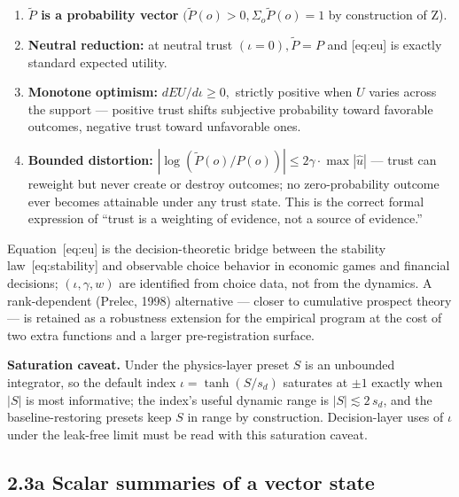 \documentclass[
]{article}
\begin{document}
\begin{enumerate}
\def\labelenumi{\arabic{enumi}.}
\item
  \textbf{\(\tilde{P}\) is a probability vector}
  \((\tilde{P}(o) > 0, \Sigma_o \tilde{P}(o) = 1\) by construction of
  Z).
\item
  \textbf{Neutral reduction:} at neutral trust
  \((\iota = 0), \tilde{P} = P\) and {[}eq:eu{]} is exactly standard
  expected utility.
\item
  \textbf{Monotone optimism:} \(dEU/d\iota \geq 0,\) strictly positive
  when \(U\) varies across the support --- positive trust shifts
  subjective probability toward favorable outcomes, negative trust
  toward unfavorable ones.
\item
  \textbf{Bounded distortion:}
  \(|\log(\tilde{P}(o)/P(o))| \leq 2\gamma\cdot \max|\hat{u}|\) ---
  trust can reweight but never create or destroy outcomes; no
  zero-probability outcome ever becomes attainable under any trust
  state. This is the correct formal expression of ``trust is a weighting
  of evidence, not a source of evidence.''
\end{enumerate}

Equation~{[}eq:eu{]} is the decision-theoretic bridge between the
stability law~{[}eq:stability{]} and observable choice behavior in
economic games and financial decisions; \((\iota, \gamma, w)\) are
identified from choice data, not from the dynamics. A rank-dependent
(Prelec, 1998) alternative --- closer to cumulative prospect theory ---
is retained as a robustness extension for the empirical program at the
cost of two extra functions and a larger pre-registration surface.

\textbf{Saturation caveat.} Under the physics-layer preset \(S\) is an
unbounded integrator, so the default index \(\iota = \tanh(S/s_d)\)
saturates at \(\pm 1\) exactly when \(|S|\) is most informative; the
index's useful dynamic range is \(|S| \lesssim 2\,s_d\), and the
baseline-restoring presets keep \(S\) in range by construction.
Decision-layer uses of \(\iota\) under the leak-free limit must be read
with this saturation caveat.

\subsection{2.3a Scalar summaries of a vector
state}\label{a-scalar-summaries-of-a-vector-state}
\end{document}
